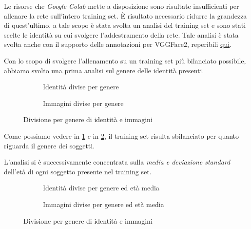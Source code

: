  Le risorse che \textit{Google Colab} mette a disposizione sono risultate insufficienti per allenare la rete sull'intero training set. È risultato necessario ridurre la grandezza di quest'ultimo, a tale scopo è stata svolta un analisi del training set e sono stati scelte le identità su cui svolgere l'addestramento della rete. Tale analisi è stata svolta anche con il supporto delle annotazioni per VGGFace2, reperibili \href{https://github.com/MiviaLab/GenderRecognitionFramework/releases/tag/0}{qui}.

Con lo scopo di svolgere l'allenamento su un training set più bilanciato possibile, abbiamo svolto una prima analisi sul genere delle identità presenti.

\begin{figure}[H]

\begin{subfigure}{0.5\textwidth}
\def\svgscale{0.5}

\caption{Identità divise per genere}
\label{sfig:Ids per gender}
\end{subfigure}
\begin{subfigure}{0.5\textwidth}
\def\svgscale{0.5}

\caption{Immagini divise per genere}
\label{sfig:Images per gender}
\end{subfigure}
\caption{Divisione per genere di identità e immagini}
\label{fig:gender_division}
\end{figure}

Come possiamo vedere in \ref{sfig:Ids per gender} e in \ref{sfig:Images per gender}, il training set risulta sbilanciato per quanto riguarda il genere dei soggetti.

L'analisi si è successivamente concentrata sulla \emph{media e deviazione standard} dell'età di ogni soggetto presente nel training set.

\begin{figure}[H]

\begin{subfigure}{0.5\textwidth}
\def\svgscale{0.42}

\caption{Identità divise per genere ed età media}
\label{sfig:Ids per gender and mean age}
\end{subfigure}
\begin{subfigure}{0.5\textwidth}
\def\svgscale{0.42}

\caption{Immagini divise per genere ed età media}
\label{sfig:Images per gender and mean age}
\end{subfigure}
\caption{Divisione per genere di identità e immagini}
\label{fig:gender_age_division}
\end{figure}

